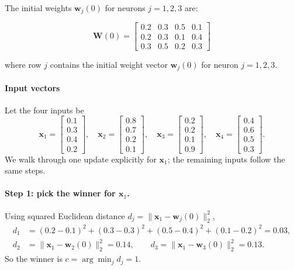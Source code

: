 The initial weights \(\mathbf{w}_j(0)\) for neurons \(j=1,2,3\) are:

\[
\mathbf{W}(0) =
\begin{bmatrix}
0.2 & 0.3 & 0.5 & 0.1 \\
0.2 & 0.3 & 0.1 & 0.4 \\
0.3 & 0.5 & 0.2 & 0.3
\end{bmatrix}
\]

where row \(j\) contains the initial weight vector \(\mathbf{w}_j(0)\) for neuron \(j = 1,2,3\).

\paragraph{Input vectors}
Let the four inputs be
\[
\mathbf{x}_1=
\begin{bmatrix}
0.1\\ 0.3\\ 0.4\\ 0.2
\end{bmatrix},\quad
\mathbf{x}_2=
\begin{bmatrix}
0.8\\ 0.7\\ 0.2\\ 0.1
\end{bmatrix},\quad
\mathbf{x}_3=
\begin{bmatrix}
0.2\\ 0.2\\ 0.1\\ 0.9
\end{bmatrix},\quad
\mathbf{x}_4=
\begin{bmatrix}
0.4\\ 0.6\\ 0.5\\ 0.3
\end{bmatrix}.
\]
We walk through one update explicitly for \(\mathbf{x}_1\); the remaining inputs follow the same steps.

\paragraph{Step 1: pick the winner for \(\mathbf{x}_1\).}
Using squared Euclidean distance \(d_j=\|\mathbf{x}_1-\mathbf{w}_j(0)\|_2^2\),
\begin{align*}
d_1 &= (0.2-0.1)^2 + (0.3-0.3)^2 + (0.5-0.4)^2 + (0.1-0.2)^2 = 0.03,\\
d_2 &= \|\mathbf{x}_1-\mathbf{w}_2(0)\|_2^2 = 0.14,\qquad
d_3 = \|\mathbf{x}_1-\mathbf{w}_3(0)\|_2^2 = 0.13.
\end{align*}
So the winner is \(c=\arg\min_j d_j = 1\).

